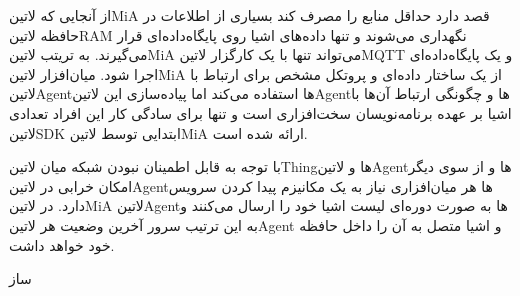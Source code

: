 \documentclass[]{assignment}
\begin{document}
از آنجایی که ‌لاتین{MiA} قصد دارد حداقل منابع را مصرف کند بسیاری از اطلاعات در حافظه ‌لاتین{RAM} نگهداری می‌شوند و تنها داده‌های اشیا روی پایگاه‌داده‌ای قرار می‌گیرند.
به تریتب ‌لاتین{MiA} می‌تواند تنها با یک کارگزار ‌لاتین{MQTT} و یک پایگاه‌داده‌ای اجرا شود.
میان‌افزار ‌لاتین{MiA} از یک ساختار داده‌ای و پروتکل مشخص برای ارتباط با ‌لاتین{Agent}ها استفاده می‌کند اما پیاده‌سازی این ‌لاتین{Agent}ها و چگونگی ارتباط آن‌ها با
اشیا بر عهده برنامه‌نویسان سخت‌افزاری است و تنها برای سادگی کار این افراد تعدادی ‌لاتین{SDK} ابتدایی توسط ‌لاتین{MiA} ارائه شده است.

با توجه به قابل اطمینان نبودن شبکه میان ‌لاتین{Thing}ها و ‌لاتین{Agent}ها و از سوی دیگر امکان خرابی در ‌لاتین{Agent}ها هر میان‌افزاری نیاز به یک مکانیزم پیدا کردن سرویس
دارد. در ‌لاتین{MiA} ‌لاتین{Agent}ها به صورت دوره‌ای لیست اشیا خود را ارسال می‌کنند و به این ترتیب سرور آخرین وضعیت هر ‌لاتین{Agent} و اشیا متصل به آن را داخل حافظه خود خواهد داشت.

‌ساز
\end{document}
